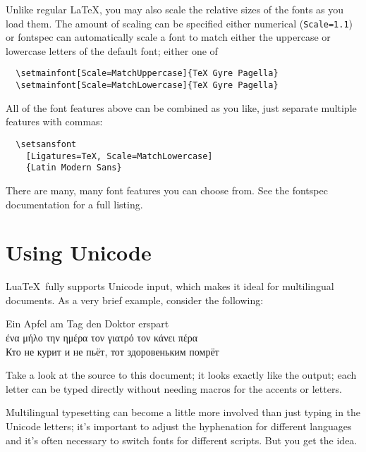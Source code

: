 \documentclass{article}
\begin{document}
Unlike regular \LaTeX, you may also scale the relative sizes of the fonts as you load them. The amount of scaling can be specified either  numerical (\verb|Scale=1.1|) or \textsf{fontspec} can automatically scale a font to match either the uppercase or lowercase letters of the default font; either one of
\begin{verbatim}
  \setmainfont[Scale=MatchUppercase]{TeX Gyre Pagella}
  \setmainfont[Scale=MatchLowercase]{TeX Gyre Pagella}
\end{verbatim}

All of the font features above can be combined as you like, just separate multiple features with commas:
\begin{verbatim}
  \setsansfont
    [Ligatures=TeX, Scale=MatchLowercase]
    {Latin Modern Sans}
\end{verbatim}

There are many, many font features you can choose from. See the \textsf{fontspec} documentation for a full listing.

\section{Using Unicode}

Lua\TeX\ fully supports Unicode input, which makes it ideal for multilingual documents. As a very brief example, consider the following:
\begin{center}
Ein Apfel am Tag den Doktor erspart\\
ένα μήλο την ημέρα τον γιατρό τον κάνει πέρα\\
Кто не курит и не пьёт, тот здоровеньким помрёт
\end{center}
Take a look at the source to this document; it looks exactly like the output; each letter can be typed directly without needing macros for the accents or letters.

Multilingual typesetting can become a little more involved than just typing in the Unicode letters; it's important to adjust the hyphenation for different languages and it's often necessary to switch fonts for different scripts. But you get the idea.
\end{document}
